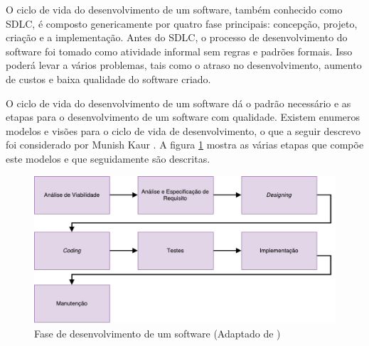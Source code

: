 O ciclo de vida do desenvolvimento de um software, também conhecido como \ac{SDLC}, é composto genericamente por quatro fase principais: concepção, projeto, criação e a implementação. Antes do \ac{SDLC}, o processo de desenvolvimento do software foi tomado como atividade informal sem regras e padrões formais. Isso poderá levar a vários problemas, tais como o atraso no desenvolvimento, aumento de custos e baixa qualidade do software criado. 

O ciclo de vida do desenvolvimento de um software dá o padrão necessário e as etapas para o desenvolvimento de um software com qualidade. Existem enumeros modelos e visões para o ciclo de vida de desenvolvimento, o que a seguir descrevo foi considerado por Munish Kaur \cite{Saini2014}. A figura \ref{sdlcartic} mostra as várias etapas que compõe este modelos e que seguidamente são descritas. 


\begin{figure}[!htb]
	\centering
	\includegraphics[scale=0.6]{esquemas/desenvolvimentoSW.pdf}
	\caption[Fase de desenvolvimento de um software ]{Fase de desenvolvimento de um software (Adaptado de \cite{Saini2014})}
	\label{sdlcartic}
\end{figure}




